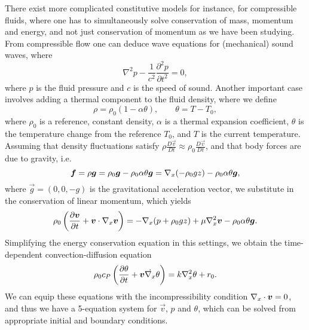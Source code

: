 There exist more complicated constitutive models for instance, for compressible fluids, where one has to simultaneously solve conservation of mass, momentum and energy, and not just conservation of momentum as we have been studying. From compressible flow one can deduce wave equations for (mechanical) sound waves, where 
\begin{equation}
    \nabla^2 p - \frac{1}{c^2}\frac{\partial^2 p}{\partial t^2} = 0,
\end{equation}
where $p$ is the fluid pressure and $c$ is the speed of sound. Another important case involves adding a thermal component to the fluid density, where we define 
\begin{equation}
    \rho = \rho_0 (1-\alpha \theta),\qquad \theta = T - T_0,
\end{equation}
where $\rho_0$ is a reference, constant density, $\alpha$ is a thermal expansion coefficient, $\theta$ is the temperature change from the reference $T_0$, and $T$ is the current temperature. Assuming that density fluctuations satisfy $\rho\frac{D\vec v}{Dt}\approx \rho_0\frac{D\vec v}{Dt}$, and that body forces are due to gravity, i.e.
\begin{equation}
    \vec f = \rho\vec g = \rho_0\vec g - \rho_0\alpha\theta \vec g = \vx(-\rho_0 g z) - \rho_0\alpha\theta\vec g,
\end{equation}
where $\vec g = (0,0,-g)$ is the gravitational acceleration vector, we substitute in the conservation of linear momentum, which yields 
\begin{equation}
    \rho_0\left(\frac{\partial\vec v}{\partial t}+\vec v \cdot\vx\vec v\right) = -\vx(p+\rho_0 g z) + \mu\vx^2\vec v - \rho_0 \alpha  \theta\vec g.
\end{equation} 
Simplifying the energy conservation equation in this settings, we obtain the time-dependent convection-diffusion equation 
\begin{equation}
    \rho_0 c_P\left(\frac{\partial \theta}{\partial t} + \vec v \dot\vx\theta\right) = k\vx^2\theta + r_0.
\end{equation}
We can equip these equations with the incompressibility condition $\vx\cdot\vec v = 0$, and thus we have a 5-equation system for $\vec v$, $p$ and $\theta$, which can be solved from appropriate initial and boundary conditions. 

